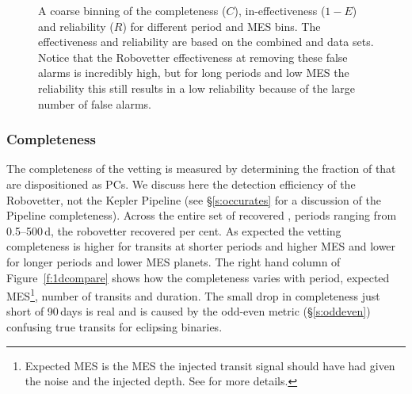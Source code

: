 \begin{figure}[h!]
\begin{center}
\caption{ A coarse binning of the completeness ($C$), in-effectiveness ($1-E$) and reliability ($R$) for different period and MES bins. The effectiveness and reliability are based on the combined \invtce{} and \scrtce{} data sets. Notice that the Robovetter effectiveness at removing these false alarms is incredibly high, but for long periods and low MES the reliability this still results in a low reliability because of the large number of false alarms. }
\label{f:scoregrid}
\end{center}
\end{figure}



\subsubsection{Completeness}
The completeness of the vetting is measured by determining the fraction of  that are dispositioned as PCs. We discuss here the detection efficiency of the Robovetter, not the Kepler Pipeline (see \S\ref{s:occurates} for a discussion of the Pipeline completeness). Across the entire set of recovered , periods ranging from 0.5--500\,d, the robovetter recovered \completeness{} per cent. As expected the vetting completeness is higher for transits at shorter periods and higher MES and lower for longer periods and lower MES planets. The right hand column of Figure~\ref{f:1dcompare} shows how the completeness varies with period, expected MES\footnote{Expected MES is the MES the injected transit signal should have had given the noise and the injected depth. See \citet{Christiansen2017} for more details.}, number of transits and duration. The small drop in completeness just short of 90\,days is real and is caused by the odd-even metric (\S\ref{s:oddeven}) confusing true transits for eclipsing binaries.  

